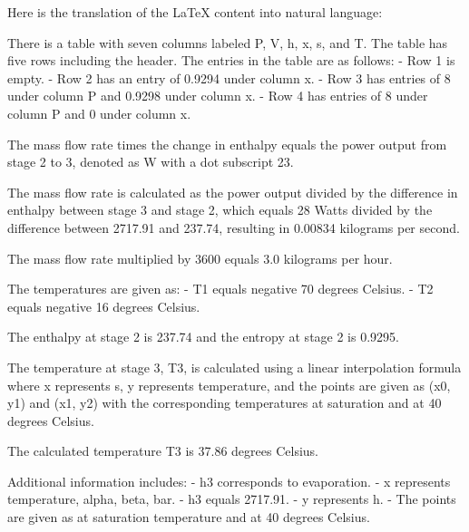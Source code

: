Here is the translation of the LaTeX content into natural language:

There is a table with seven columns labeled P, V, h, x, s, and T. The table has five rows including the header. The entries in the table are as follows:
- Row 1 is empty.
- Row 2 has an entry of 0.9294 under column x.
- Row 3 has entries of 8 under column P and 0.9298 under column x.
- Row 4 has entries of 8 under column P and 0 under column x.

The mass flow rate times the change in enthalpy equals the power output from stage 2 to 3, denoted as W with a dot subscript 23.

The mass flow rate is calculated as the power output divided by the difference in enthalpy between stage 3 and stage 2, which equals 28 Watts divided by the difference between 2717.91 and 237.74, resulting in 0.00834 kilograms per second.

The mass flow rate multiplied by 3600 equals 3.0 kilograms per hour.

The temperatures are given as:
- T1 equals negative 70 degrees Celsius.
- T2 equals negative 16 degrees Celsius.

The enthalpy at stage 2 is 237.74 and the entropy at stage 2 is 0.9295.

The temperature at stage 3, T3, is calculated using a linear interpolation formula where x represents s, y represents temperature, and the points are given as (x0, y1) and (x1, y2) with the corresponding temperatures at saturation and at 40 degrees Celsius.

The calculated temperature T3 is 37.86 degrees Celsius.

Additional information includes:
- h3 corresponds to evaporation.
- x represents temperature, alpha, beta, bar.
- h3 equals 2717.91.
- y represents h.
- The points are given as at saturation temperature and at 40 degrees Celsius.